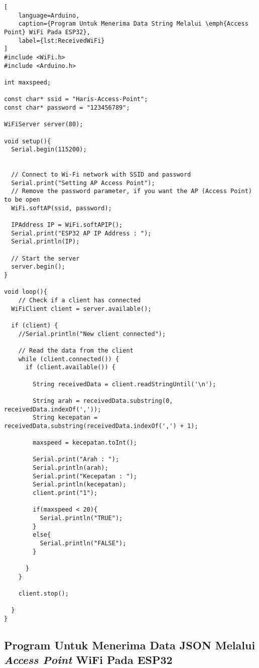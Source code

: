 \begin{lstlisting}[
    language=Arduino,
    caption={Program Untuk Menerima Data String Melalui \emph{Access Point} WiFi Pada ESP32},
    label={lst:ReceivedWiFi}
]
#include <WiFi.h>
#include <Arduino.h>

int maxspeed;

const char* ssid = "Haris-Access-Point";
const char* password = "123456789";

WiFiServer server(80);

void setup(){
  Serial.begin(115200);


  // Connect to Wi-Fi network with SSID and password
  Serial.print("Setting AP Access Point");
  // Remove the password parameter, if you want the AP (Access Point) to be open
  WiFi.softAP(ssid, password);
 
  IPAddress IP = WiFi.softAPIP();
  Serial.print("ESP32 AP IP Address : ");
  Serial.println(IP);

  // Start the server
  server.begin();
}

void loop(){
    // Check if a client has connected
  WiFiClient client = server.available();

  if (client) {
    //Serial.println("New client connected");
    
    // Read the data from the client
    while (client.connected()) {
      if (client.available()) {
    
        String receivedData = client.readStringUntil('\n');

        String arah = receivedData.substring(0, receivedData.indexOf(','));
        String kecepatan = receivedData.substring(receivedData.indexOf(',') + 1);

        maxspeed = kecepatan.toInt();

        Serial.print("Arah : ");
        Serial.println(arah);
        Serial.print("Kecepatan : ");
        Serial.println(kecepatan);
        client.print("1");

        if(maxspeed < 20){
          Serial.println("TRUE");
        }
        else{
          Serial.println("FALSE");
        }

      }
    }

    client.stop();

  }
}
\end{lstlisting}

\subsection*{Program Untuk Menerima Data JSON Melalui \emph{Access Point} WiFi Pada ESP32}

